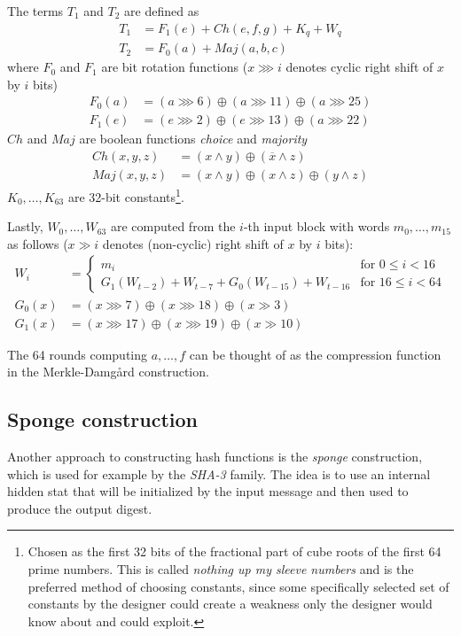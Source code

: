 The terms $T_1$ and $T_2$ are defined as
\begin{align*}
T_1 &= F_1(e) + Ch(e, f, g) + K_q + W_q \\
T_2 &= F_0(a) + Maj(a, b, c)
\end{align*}
where $F_0$ and $F_1$ are bit rotation functions ($x \ggg i$ denotes cyclic right shift of $x$ by $i$ bits)
\begin{align*}
F_0(a) &= (a \ggg 6) \oplus (a \ggg 11) \oplus (a \ggg 25) \\
F_1(e) &= (e \ggg 2) \oplus (e \ggg 13) \oplus (a \ggg 22)
\end{align*}
$Ch$ and $Maj$ are boolean functions \emph{choice} and \emph{majority}
\begin{align*}
Ch(x,y,z) &= (x \land y) \oplus (\overline{x} \land z) \\
Maj(x,y,z) &= (x \land y) \oplus (x \land z) \oplus (y \land z)
\end{align*}
$K_0, \dots, K_{63}$ are 32-bit constants\footnote{Chosen as the first 32 bits of the fractional part of cube roots of the first 64 prime numbers. This is called \emph{nothing up my sleeve numbers} and is the preferred method of choosing constants, since some specifically selected set of constants by the designer could create a weakness only the designer would know about and could exploit.}.

Lastly, $W_0, \dots, W_{63}$ are computed from the $i$-th input block with words $m_0, \dots, m_{15}$ as follows ($x \gg i$ denotes (non-cyclic) right shift of $x$ by $i$ bits):
\begin{align*}
W_i &=
\begin{cases}
m_i & \text{for~} 0 \le i < 16 \\
G_1(W_{t-2}) + W_{t-7} + G_0(W_{t-15}) + W_{t-16} & \text{for~} 16 \le i < 64
\end{cases} \\
G_0(x) &= (x \ggg 7) \oplus (x \ggg 18) \oplus (x \gg 3) \\
G_1(x) &= (x \ggg 17) \oplus (x \ggg 19) \oplus (x \gg 10)
\end{align*}

The 64 rounds computing $a, \dots, f$ can be thought of as the compression function in the Merkle-Damg\aa rd construction.

\subsection{Sponge construction}
Another approach to constructing hash functions is the \emph{sponge} construction, which is used for example by the \emph{SHA-3} family.
The idea is to use an internal hidden stat that will be initialized by the input message and then used to produce the output digest.

